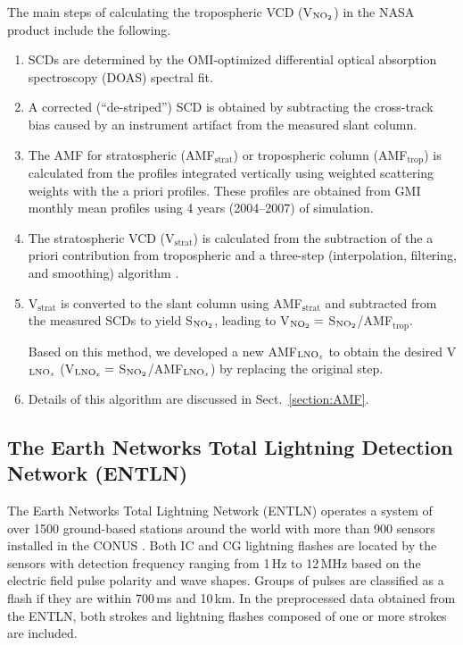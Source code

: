 \documentclass[amt]{copernicus}
\begin{document}
The main steps of calculating the  tropospheric VCD (V$_\chem{NO_2}$) in the NASA product include the following.
\begin{enumerate}
\item SCDs are determined by the OMI-optimized differential optical absorption spectroscopy (DOAS) spectral fit.

\item A corrected (``de-striped'') SCD is obtained by subtracting the cross-track bias caused by an instrument artifact from the measured slant column.

\item The AMF for stratospheric (AMF$_\mathrm{strat}$) or tropospheric column (AMF$_\mathrm{trop}$) is calculated from the  profiles integrated vertically using weighted scattering weights with the a priori profiles. These profiles are obtained from GMI monthly mean profiles using 4 years (2004--2007) of simulation.

\item The stratospheric  VCD (V$_\mathrm{strat}$) is calculated from the subtraction of the a priori contribution from tropospheric  and a three-step (interpolation, filtering, and smoothing) algorithm  \citep{Bucsela.2013}.

\item V$_\mathrm{strat}$ is converted to the slant column using AMF$_\mathrm{strat}$ and subtracted from the measured SCDs to yield S$_\chem{NO_2}$, leading to V$_\chem{NO_2} =$ S$_\chem{NO_2}$/AMF$_\mathrm{trop}$.

Based on this method, we developed a new AMF$_\chem{LNO_\mathit{x}}$ to obtain the desired V$_\chem{LNO_\mathit{x}}$ (V$_\chem{LNO_\mathit{x}} =$ S$_\chem{NO_2}$/AMF$_\chem{LNO_\mathit{x}}$) by replacing the original step. \item
Details of this algorithm are discussed in Sect.~\ref{section:AMF}.
\end{enumerate}

\subsection{The Earth Networks Total Lightning Detection Network (ENTLN)}
The Earth Networks Total Lightning Network (ENTLN) operates a system of over 1500 ground-based stations around the world with more than 900 sensors installed in the CONUS \citep{Zhu.2017}.
Both IC and CG lightning flashes are located by the sensors with detection frequency ranging from 1\,Hz to 12\,MHz based on the electric field pulse polarity and wave shapes.
Groups of pulses are classified as a flash if they are within 700\,ms and 10\,km.
In the preprocessed data obtained from the ENTLN, both strokes and lightning flashes composed of one or more strokes are included.
\end{document}

